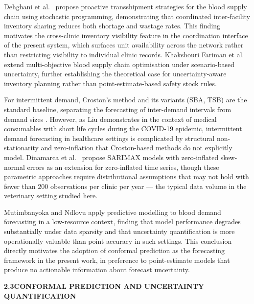 \documentclass[12pt,a4paper]{article}
\begin{document}
\noindent Dehghani et al.\ \cite{dehghani2021} propose proactive transshipment strategies for the blood supply chain using stochastic programming, demonstrating that coordinated inter-facility inventory sharing reduces both shortage and wastage rates. This finding motivates the cross-clinic inventory visibility feature in the coordination interface of the present system, which surfaces unit availability across the network rather than restricting visibility to individual clinic records. Khakshouri Fariman et al.\ \cite{khakshouri2024} extend multi-objective blood supply chain optimisation under scenario-based uncertainty, further establishing the theoretical case for uncertainty-aware inventory planning rather than point-estimate-based safety stock rules.

\noindent For intermittent demand, Croston's method and its variants (SBA, TSB) are the standard baseline, separating the forecasting of inter-demand intervals from demand sizes \cite{croston1972}. However, as Liu \cite{liu2020} demonstrates in the context of medical consumables with short life cycles during the COVID-19 epidemic, intermittent demand forecasting in healthcare settings is complicated by structural non-stationarity and zero-inflation that Croston-based methods do not explicitly model. Dinamarca et al.\ \cite{dinamarca2025} propose SARIMAX models with zero-inflated skew-normal errors as an extension for zero-inflated time series, though these parametric approaches require distributional assumptions that may not hold with fewer than 200 observations per clinic per year — the typical data volume in the veterinary setting studied here.

\noindent Mutimbanyoka and Ndlovu \cite{mutimbanyoka2025} apply predictive modelling to blood demand forecasting in a low-resource context, finding that model performance degrades substantially under data sparsity and that uncertainty quantification is more operationally valuable than point accuracy in such settings. This conclusion directly motivates the adoption of conformal prediction as the forecasting framework in the present work, in preference to point-estimate models that produce no actionable information about forecast uncertainty.

\vspace{2em}
\noindent\textbf{2.3\quad CONFORMAL PREDICTION AND UNCERTAINTY QUANTIFICATION}
\vspace{0.8em}
\end{document}
